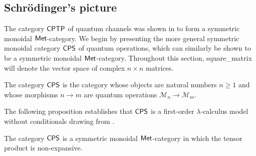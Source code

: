 \subsection{Schrödinger's picture} \label{subsec:shodinger}

The category $\mathsf{CPTP}$ of quantum channels was shown in \cite{dahlqvist2023syntactic} to form a symmetric monoidal $\mathsf{Met}$-category. We begin by presenting the more general symmetric monoidal category $\mathsf{CPS}$ of quantum operations, which can similarly be shown to be a symmetric monoidal $\mathsf{Met}$-category. Throughout this section, \gls{square_matrix} will denote the vector space of complex $n \times n$ matrices.



\begin{definition} \label{ex:cat_cps}
The category $\mathsf{CPS}$ is the category whose objects are natural numbers $n \geq 1$ and whose morphisms $n \rightarrow m$ are quantum operations $\mathcal{M}_n \rightarrow \mathcal{M}_m$.
\end{definition}

The following proposition establishes that $\mathsf{CPS}$ is a first-order $\lambda$-calculus model without conditionals drawing from \cite{dahlqvist2023syntactic}.


\begin{proposition} \label{prop:Q_monoidal} 
  The category $\mathsf{CPS}$ is a symmetric monoidal $\mathsf{Met}$-category in which the tensor product is non-expansive.
\end{proposition}


